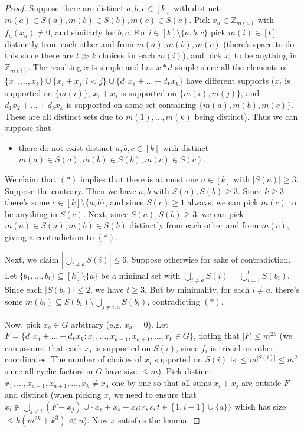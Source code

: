 \documentclass[a4paper,11pt,hidelinks]{amsart}
\theoremstyle{definition}
\begin{document}
\begin{proof}
Suppose there are distinct $a,b,c\in [k]$ with distinct $m(a)\in S(a), m(b)\in S(b), m(c) \in S(c)$. 
Pick $x_a\in \mathbb{Z}_{m(a)}$ with $f_a(x_a)\neq 0$, and similarly for $b,c$.
For $i\in[k]\setminus\{a,b,c\}$ pick $m(i)\in [t]$ distinctly from each other and from $m(a), m(b), m(c)$ (there's space to do this since there are $t\gg k$ choices for each $m(i)$), and pick  $x_i$ to be anything in  $\mathbb{Z}_{m(i)}$. The resulting $x$ is simple and has $x\ast d$ simple since all the elements of $\{x_1, \dots, x_k\}\cup\{x_i+x_j: i< j\}\cup \{d_1x_1+\dots+d_kx_k\}$  have different supports ($x_i$ is supported on $\{m(i)\}$, $x_i+x_j$ is supported on $\{m(i), m(j)\}$,  and $d_1x_2+\dots+d_kx_k$ is supported on some set containing $\{m(a), m(b), m(c)\}$. These are all distinct sets due to $m(1), \dots, m(k)$ being distinct).
Thus we can suppose that 
\begin{itemize}
\item[$(\ast)$] there do not exist  distinct $a,b,c\in [k]$ with distinct $m(a)\in S(a), m(b)\in S(b), m(c) \in S(c)$. 
\end{itemize}
\par We claim that $(\ast)$ implies that there is at most one $a\in [k]$ with $|S(a)|\geq 3$. Suppose the contrary. Then we have $a,b$ with $S(a), S(b)\geq 3$. Since $k\geq 3$ there's some $c\in [k]\setminus\{a,b\}$, and since $S(c)\geq 1$ always, we can pick $m(c)$ to be anything in $S(c)$. Next, since $S(a), S(b)\geq 3$, we can pick $m(a)\in S(a), m(b)\in S(b)$ distinctly from each other and from $m(c)$, giving a contradiction to $(\ast)$. 
\par Next, we claim $|\bigcup_{i\neq a} S(i)|\leq 6$. Suppose otherwise for sake of contradiction. Let $\{b_1, \dots, b_t\}\subseteq [k]\setminus \{a\}$ be a minimal set with $\bigcup_{i\neq a} S(i)=\bigcup_{i=1}^tS(b_i)$. Since each $|S(b_i)|\leq 2$, we have $t\geq 3$. But by minimality, for each $i\ne a$, there's some $m(b_i)\subseteq S(b_i)\setminus \bigcup_{j\neq i,a}S(b_i)$, contradicting $(\ast)$. 
\par Now, pick  $x_a\in G$ arbitrary (e.g. $x_a=0$). Let $F=\{d_1x_1+\dots +d_kx_k: x_1, \dots,x_{a-1}, x_{a+1}, \dots,  x_k\in G\}$, noting that $|F|\leq m^{2k}$ (we can assume that each $x_i$ is supported on $S(i)$, since $f_i$ is trivial on other coordinates. The number of choices of $x_i$ supported on $S(i)$ is $\leq m^{|S(i)|}\leq m^2$ since all cyclic factors in $G$ have size $\leq m$). Pick distinct $x_1, \dots, x_{a-1}, x_{a+1}, \dots, x_k\neq x_a$ one by one so that all sums $x_i+x_j$ are outside $F$ and distinct (when picking $x_i$   we need to ensure that $x_{i}\not\in  \bigcup_{j<i} (F-x_j)\cup\{x_r+x_s-x_{t}: r,s,t\in  [1, i-1]\cup \{a\}\}$ which has size $\leq k(m^{2k}+k^3)\ll n$). Now $x$ satisfies the lemma.
\end{proof}
\end{document}

